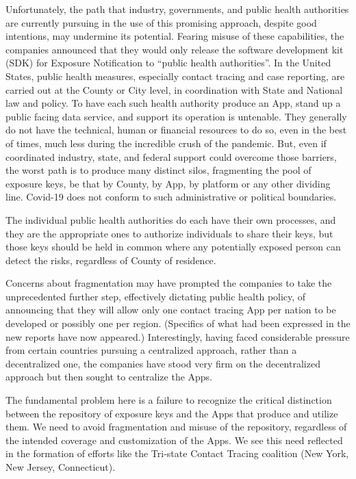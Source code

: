 Unfortunately, the path that industry, governments, and public health authorities are currently pursuing in the use of this promising approach, despite good intentions, may undermine its potential.
Fearing misuse of these capabilities, the companies announced that they would only release the software development kit (SDK) for Exposure Notification to “public health authorities”.
In the United States, public health measures, especially contact tracing and case reporting, are carried out at the County or City level, in coordination with State and National law and policy.
To have each such health authority produce an App, stand up a public facing data service, and support its operation is untenable.
They generally do not have the technical, human or financial resources to do so, even in the best of times, much less during the incredible crush of the pandemic.
But, even if coordinated industry, state, and federal support could overcome those barriers, the worst path is to produce many distinct silos, fragmenting the pool of exposure keys, be that by County, by App, by platform or any other dividing line.
Covid-19 does not conform to such administrative or political boundaries.

The individual public health authorities do each have their own processes, and they are the appropriate ones to authorize individuals to share their keys, but those keys should be held in common where any potentially exposed person can detect the risks, regardless of County of residence.

Concerns about fragmentation may have prompted the companies to take the unprecedented further step, effectively dictating public health policy, of announcing that they will allow only one contact tracing App per nation to be developed or possibly one per region.
(Specifics of what had been expressed in the new reports have now appeared.)
Interestingly, having faced considerable pressure from certain countries pursuing a centralized approach, rather than a decentralized one, the companies have stood very firm on the decentralized approach but then sought to centralize the Apps.

The fundamental problem here is a failure to recognize the critical distinction between the repository of exposure keys and the Apps that produce and utilize them.
We need to avoid fragmentation and misuse of the repository, regardless of the intended coverage and customization of the Apps.
We see this need reflected in the formation of efforts like the Tri-state Contact Tracing coalition (New York, New Jersey, Connecticut).

